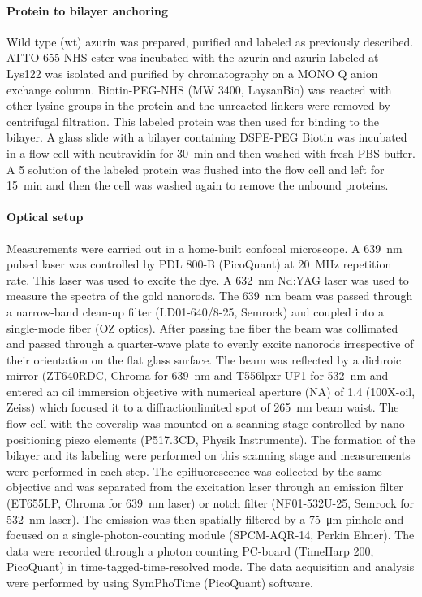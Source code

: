 \paragraph*{Protein to bilayer anchoring}
Wild type (wt) azurin was prepared, purified and labeled as previously described.\cite{VANDEKAMP1990283,nicolardi2012top-down}
ATTO 655 NHS ester was incubated with the azurin and azurin labeled at Lys122 was isolated and purified by chromatography on a MONO Q anion exchange column. 
Biotin-PEG-NHS (MW 3400, LaysanBio) was reacted with other lysine groups in the protein and the unreacted linkers were removed by centrifugal filtration.
This labeled protein was then used for binding to the bilayer.
A glass slide with a bilayer containing DSPE-PEG Biotin was incubated in a flow cell with neutravidin for \SI{30}{\minute} and then washed with fresh PBS buffer.
A \SI{5}{\nM} solution of the labeled protein was flushed into the flow cell and left for \SI{15}{\minute} and then the cell was washed again to remove the unbound proteins.

\paragraph*{Optical setup}
Measurements were carried out in a home-built confocal microscope.
A \SI{639}{\nm} pulsed laser was controlled by PDL 800-B (PicoQuant) at \SI{20}{\MHz} repetition rate.
This laser was used to excite the dye.
A \SI{632}{\nm} Nd:YAG laser was used to measure the spectra of the gold nanorods.
The \SI{639}{\nm} beam was passed through a narrow-band clean-up filter (LD01-640/8-25, Semrock) and coupled into a single-mode fiber (OZ optics).
After passing the fiber the beam was collimated and passed through a quarter-wave plate to evenly excite nanorods irrespective of their orientation on the flat glass surface.
The beam was reflected by a dichroic mirror (ZT640RDC, Chroma for \SI{639}{\nm} and T556lpxr-UF1 for \SI{532}{\nm} and entered an oil immersion objective with numerical aperture (NA) of 1.4 (100X-oil, Zeiss) which focused it to a diffractionlimited spot of \SI{265}{\nm} beam waist.
The flow cell with the coverslip was mounted on a scanning stage controlled by nano-positioning piezo elements (P517.3CD, Physik Instrumente).
The formation of the bilayer and its labeling were performed on this scanning stage and measurements were performed in each step.
The epifluorescence was collected by the same objective and was separated from the excitation laser through an emission filter (ET655LP, Chroma for \SI{639}{\nm} laser) or 
notch filter (NF01-532U-25, Semrock for \SI{532}{\nm} laser).
The emission was then spatially filtered by a \SI{75}{\um} pinhole and focused on a single-photon-counting module (SPCM-AQR-14, Perkin Elmer).
The data were recorded through a photon counting PC-board (TimeHarp 200, PicoQuant) in time-tagged-time-resolved mode.
The data acquisition and analysis were performed by using SymPhoTime (PicoQuant) software.

